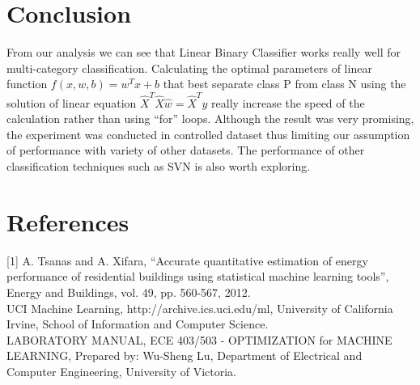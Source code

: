 \section{Conclusion}
\label{sect:conclusion}
From our analysis we can see that Linear Binary Classifier works really well for multi-category classification. Calculating the optimal parameters of linear function $f(x,w,b)=w^Tx+b$ that best separate class P from class N using the solution of linear equation $\hat{X}^T\hat{X}\hat{w}=\hat{X}^Ty$ really increase the speed of the calculation rather than using ``for'' loops. Although the result was very promising, the experiment was conducted in controlled dataset thus limiting our assumption of performance with variety of other datasets. The performance of other classification techniques such as SVN is also worth exploring.  

\section{References}
[1] A. Tsanas and A. Xifara, “Accurate quantitative estimation of energy performance of residential buildings using statistical machine learning tools”, Energy and Buildings, vol. 49, pp. 560-567, 2012. \\\relax
[2] UCI Machine Learning, http://archive.ics.uci.edu/ml, University of California Irvine, School of Information and Computer Science. \\\relax
[3] LABORATORY MANUAL, ECE 403/503 - OPTIMIZATION for MACHINE LEARNING, Prepared by: Wu-Sheng Lu, Department of Electrical and Computer Engineering, University of Victoria.
   